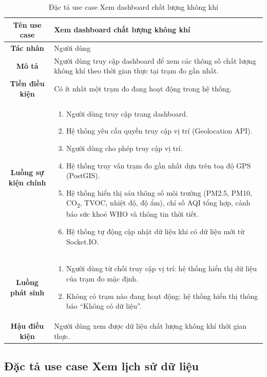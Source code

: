 \documentclass[../DoAn.tex]{subfiles}
\begin{document}
\begin{table}[H]
\centering
\caption{Đặc tả use case Xem dashboard chất lượng không khí}
\label{table:uc_dashboard}
\small
\begin{tabularx}{\textwidth}{|c|X|}
\hline
\textbf{Tên use case} & Xem dashboard chất lượng không khí \\
\hline
\textbf{Tác nhân} & Người dùng \\
\hline
\textbf{Mô tả} & Người dùng truy cập dashboard để xem các thông số chất lượng không khí theo thời gian thực tại trạm đo gần nhất. \\
\hline
\textbf{Tiền điều kiện} & Có ít nhất một trạm đo đang hoạt động trong hệ thống. \\
\hline
\textbf{Luồng sự kiện chính} &
\begin{enumerate}[leftmargin=*, nosep]
    \item Người dùng truy cập trang dashboard.
    \item Hệ thống yêu cầu quyền truy cập vị trí (Geolocation API).
    \item Người dùng cho phép truy cập vị trí.
    \item Hệ thống truy vấn trạm đo gần nhất dựa trên toạ độ GPS (PostGIS).
    \item Hệ thống hiển thị sáu thông số môi trường (PM2.5, PM10, CO\textsubscript{2}, TVOC, nhiệt độ, độ ẩm), chỉ số AQI tổng hợp, cảnh báo sức khoẻ WHO và thông tin thời tiết.
    \item Hệ thống tự động cập nhật dữ liệu khi có dữ liệu mới từ Socket.IO.
\end{enumerate} \\
\hline
\textbf{Luồng phát sinh} &
\begin{enumerate}[leftmargin=*, nosep]
    \item[3a.] Người dùng từ chối truy cập vị trí: hệ thống hiển thị dữ liệu của trạm đo mặc định.
    \item[4a.] Không có trạm nào đang hoạt động: hệ thống hiển thị thông báo ``Không có dữ liệu''.
\end{enumerate} \\
\hline
\textbf{Hậu điều kiện} & Người dùng xem được dữ liệu chất lượng không khí thời gian thực. \\
\hline
\end{tabularx}
\end{table}

\subsection{Đặc tả use case Xem lịch sử dữ liệu}
\label{subsection:2.3.2}
\end{document}
